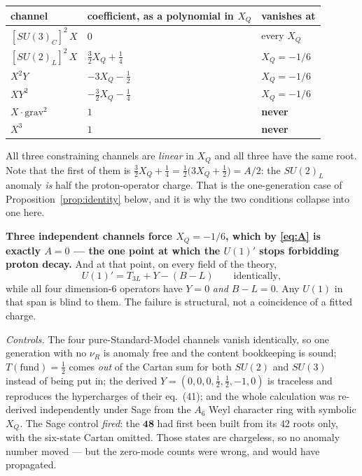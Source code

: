 \documentclass[11pt,a4paper]{article}
\newcommand{\su}[1]{SU(#1)}
\newcommand{\rep}[1]{\mathbf{#1}}
\newenvironment{keyeq}
  {\begin{center}\setlength{\fboxsep}{9pt}\setlength{\fboxrule}{0.8pt}%
   \begin{lrbox}{\keyeqbox}\begin{minipage}{0.88\textwidth}}
  {\end{minipage}\end{lrbox}%
   \fcolorbox{hdrblue!55}{hdrblue!6}{\usebox{\keyeqbox}}\end{center}}
\begin{document}
\begin{center}\small
\begin{tabular}{lll}
\toprule
\rowcolor{hdrblue!12}
channel & coefficient, as a polynomial in $X_Q$ & vanishes at\\
\midrule
$[\su3_C]^2\,X$ & $0$ & every $X_Q$\\
\rowcolor{amber!13}
$[\su2_L]^2\,X$ & $\tfrac32X_Q+\tfrac14$ & $X_Q=-1/6$\\
\rowcolor{amber!13}
$X^2Y$ & $-3X_Q-\tfrac12$ & $X_Q=-1/6$\\
\rowcolor{amber!13}
$XY^2$ & $-\tfrac32X_Q-\tfrac14$ & $X_Q=-1/6$\\
\rowcolor{warmred!13}
$X\cdot\mathrm{grav}^2$ & $1$ & \textbf{never}\\
\rowcolor{warmred!13}
$X^3$ & $1$ & \textbf{never}\\
\bottomrule
\end{tabular}
\end{center}

All three constraining channels are \emph{linear} in $X_Q$ and all three have the same root. Note
that the first of them is $\tfrac32X_Q+\tfrac14=\tfrac12\big(3X_Q+\tfrac12\big)=A/2$: the
$\su2_L$ anomaly \emph{is} half the proton-operator charge. That is the one-generation case of
Proposition~\ref{prop:identity} below, and it is why the two conditions collapse into one here.

\begin{keyeq}
\textbf{Three independent channels force $X_Q=-1/6$, which by \eqref{eq:A} is exactly $A=0$ --- the
one point at which the $U(1)'$ stops forbidding proton decay.} And at that point, on every field of
the theory,
\[
U(1)'=T_{3L}+Y-(B-L)\qquad\text{identically},
\]
while all four dimension-6 operators have $Y=0$ \emph{and} $B-L=0$. Any $U(1)$ in that span is blind
to them. The failure is structural, not a coincidence of a fitted charge.
\end{keyeq}

\emph{Controls.} The four pure-Standard-Model channels vanish identically, so one generation with no
$\nu_R$ is anomaly free and the content bookkeeping is sound; $T(\text{fund})=\tfrac12$ comes
\emph{out} of the Cartan sum for both $\su2$ and $\su3$ instead of being put in; the derived
$Y=(0,0,0,\tfrac12,\tfrac12,-1,0)$ is traceless and reproduces the hypercharges of their eq.~(41);
and the whole calculation was re-derived independently under Sage from the $A_6$ Weyl character
ring with symbolic $X_Q$. The Sage control \emph{fired}: the $\rep{48}$ had first been built from
its $42$ roots only, with the six-state Cartan omitted. Those states are chargeless, so no anomaly
number moved --- but the zero-mode counts were wrong, and would have propagated.
\end{document}
